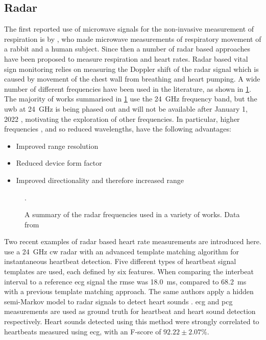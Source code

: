 \documentclass[11pt, parskip=half*,twoside=false]{scrbook}
\begin{document}
\subsection{Radar}
The first reported use of microwave signals for the non-invasive measurement of respiration is by \citet{linNoninvasiveMicrowaveMeasurement1975}, who made microwave measurements of respiratory movement of a rabbit and a human subject. Since then a number of radar based approaches have been proposed to measure respiration and heart rates. Radar based vital sign monitoring relies on measuring the Doppler shift of the radar signal which is caused by movement of the chest wall from breathing and heart pumping. A wide number of different frequencies have been used in the literature, as shown in \cref{fig:radar_freqs}. The majority of works summarised in \cref{fig:radar_freqs} use the 24~GHz frequency band, but the \gls{uwb} at 24~GHz is being phased out and will not be available after January 1, 2022 \citep{ramasubramanianMovingLegacy242018}, motivating the exploration of other frequencies. In particular, higher frequencies , and so reduced wavelengths, have the following advantages: 
\begin{itemize}
	\item Improved range resolution
	\item Reduced device form factor
	\item Improved directionality and therefore increased range
\end{itemize}

\begin{figure}[h]
	\centering
	
	\caption{A summary of the radar frequencies used in a variety of works. Data from \citet{singhMultiResidentNonContactVital2021}}.
	\label{fig:radar_freqs}
\end{figure}

Two recent examples of radar based heart rate measurements are introduced here.  \citet{willAdvancedTemplateMatching2017} use a 24~GHz \gls{cw} radar with an advanced template matching algorithm for instantaneous heartbeat detection. Five different types of heartbeat signal templates are used, each defined by six features. When comparing the interbeat interval to a reference \gls{ecg} signal the \gls{rmse} was 18.0~ms, compared to 68.2~ms with a previous template matching approach. The same authors apply a hidden semi-Markov model to radar signals to detect heart sounds \citep{willRadarBasedHeartSound2018}. \gls{ecg} and \gls{pcg} measurements are used as ground truth for heartbeat and heart sound detection respectively. Heart sounds detected using this method were strongly correlated to heartbeats measured using \gls{ecg}, with an F-score of $92.22\pm 2.07 \%$.
\end{document}
